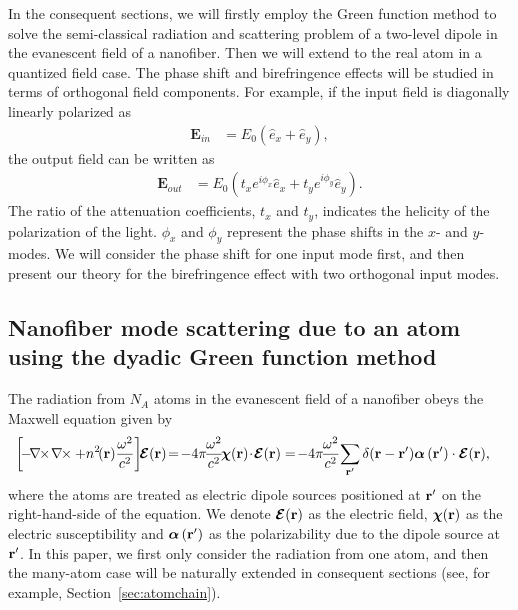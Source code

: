 \documentclass[preprint,aps,pra,onecolumn]{revtex4-1} %
\begin{document}
In the consequent sections, we will firstly employ the Green function method to solve the semi-classical radiation and scattering problem of a two-level dipole in the evanescent field of a nanofiber. Then we will extend to the real atom in a quantized field case. The phase shift and birefringence effects will be studied in terms of orthogonal field components. For example, if the input field is diagonally linearly polarized as
\begin{align}
\mathbf{E}_{in} &= E_0(\hat{e}_x+\hat{e}_y),
\end{align}
the output field can be written as
\begin{align}
\mathbf{E}_{out} &= E_0(t_xe^{i\phi_x}\hat{e}_x+t_ye^{i\phi_y}\hat{e}_y).
\end{align}
The ratio of the attenuation coefficients, $t_x$ and $t_y$, indicates the helicity of the polarization of the light. $\phi_x$ and $\phi_y$ represent the phase shifts in the $x$- and $y$-modes. We will consider the phase shift for one input mode first, and then present our theory for the birefringence effect with two orthogonal input modes. 

\subsection{Nanofiber mode scattering due to an atom using the dyadic Green function method}\label{sec:GFmethod}

The radiation from $N_A$ atoms in the evanescent field of a nanofiber obeys the Maxwell equation given by
\begin{align}\label{eq:Maxwellwithsource2}
\left[\! -\! \nabla\!\!\times\!\nabla\!\!\times + n^2\!(\br)\frac{\omega^2}{c^2} \right]\!\! \boldsymbol{\mathcal{E}}(\br) &\!=\! -4\pi\! \frac{\omega^2}{c^2}\! \boldsymbol{\chi}(\br)\! \cdot\! \boldsymbol{\mathcal{E}}(\br)=\!-4\pi\! \frac{\omega^2}{c^2}\!\sum_{\br'}\delta(\br-\br')\boldsymbol{\alpha} \, (\br')\cdot \boldsymbol{\mathcal{E}}(\br),
\end{align}
where the atoms are treated as electric dipole sources positioned at $\mathbf{r}'$ on the right-hand-side of the equation. We denote $\boldsymbol{\mathcal{E}}(\mathbf{r})$ as the electric field, $\boldsymbol{\chi}(\mathbf{r})$ as the electric susceptibility and $\boldsymbol{\alpha} \, (\mathbf{r}')$ as the polarizability due to the dipole source at $\mathbf{r}'$. In this paper, we first only consider the radiation from one atom, and then the many-atom case will be naturally extended in consequent sections (see, for example, Section~\ref{sec:atomchain}). 
\end{document}
